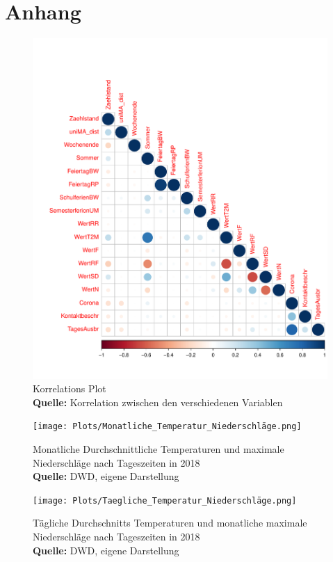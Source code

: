 \documentclass[a4paper,12pt]{thesis}
\newcommand*{\captionsource}[2]{%
	\caption[{#1}]{%
		#1%
		\\\hspace{\linewidth}%
		\textbf{Quelle:} #2%
	}%
}
\begin{document}
\chapter{Anhang}

\begin{figure}[!ht]
	\centering
	\includegraphics[width=\textwidth]{Plots/Corr_Plot.pdf}
	\captionsource{Korrelations Plot}{
		Korrelation zwischen den verschiedenen Variablen
	}
	\label{fig:meine-grafik5}
\end{figure}

\begin{figure}[!ht]
	\centering
	\texttt{[image: Plots/Monatliche\_Temperatur\_Niederschläge.png]}
	\captionsource{Monatliche Durchschnittliche Temperaturen und maximale Niederschläge nach Tageszeiten in 2018}{
		DWD, eigene Darstellung
	}
	\label{fig:meine-grafik5}
\end{figure}

\begin{figure}[!ht]
	\centering
	\texttt{[image: Plots/Taegliche\_Temperatur\_Niederschläge.png]}
	\captionsource{Tägliche Durchschnitts Temperaturen und monatliche maximale Niederschläge nach Tageszeiten in 2018}{
		DWD, eigene Darstellung
	}
	\label{fig:meine-grafik5}
\end{figure}
\end{document}
